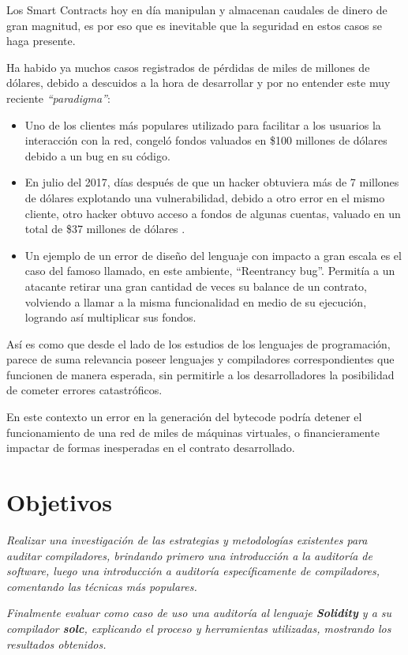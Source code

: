 Los Smart Contracts hoy en día manipulan y almacenan caudales de dinero de gran magnitud, es por eso que es inevitable que la seguridad en estos casos se haga presente.

Ha habido ya muchos casos registrados de pérdidas de miles de millones de dólares, debido a descuidos a la hora de desarrollar y por no entender este muy reciente \textit{“paradigma”}:
\begin{itemize}
\item Uno de los clientes más populares utilizado para facilitar a los usuarios la interacción con la red, congeló fondos valuados en \$100 millones de dólares debido a un bug en su código\cite{Hertig:Alyssa:Coindesk}.
\item En julio del 2017, días después de que un hacker obtuviera más de 7 millones de dólares explotando una vulnerabilidad, debido a otro error en el mismo cliente, otro hacker obtuvo acceso a fondos de algunas cuentas, valuado en un total de \$37 millones de dólares \cite{Pearson:Jordan:Motherboard}.
\item Un ejemplo de un error de diseño del lenguaje con impacto a gran escala es el caso del famoso llamado, en este ambiente, “Reentrancy bug”. Permitía a un atacante retirar una gran cantidad de veces su balance de un contrato, volviendo a llamar a la misma funcionalidad en medio de su ejecución, logrando así multiplicar sus fondos\cite{Vessenes:Peter:Vessenes}.
\end{itemize}

Así es como que desde el lado de los estudios de los lenguajes de programación, parece de suma relevancia poseer lenguajes y compiladores correspondientes que funcionen de manera esperada, sin permitirle a los desarrolladores la posibilidad de cometer errores catastróficos.

En este contexto un error en la generación del bytecode podría detener el funcionamiento de una red de miles de máquinas virtuales, o financieramente impactar de formas inesperadas en el contrato desarrollado.

\section{Objetivos}
\textit{Realizar una investigación de las estrategias y metodologías existentes para auditar compiladores, brindando primero una introducción a la auditoría de software, luego una introducción a auditoría específicamente de compiladores, comentando las técnicas más populares.}

\textit{Finalmente evaluar como caso de uso una auditoría al lenguaje \textbf{Solidity} y a su compilador \textbf{solc}, explicando el proceso y herramientas utilizadas, mostrando los resultados obtenidos.}
